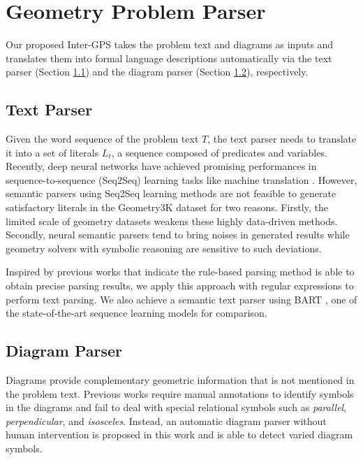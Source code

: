 \documentclass[11pt,a4paper]{article}
\newcommand{\xd}[1]{{\color{blue}{[#1]}}}
\begin{document}
\section{Geometry Problem Parser}
Our proposed Inter-GPS takes the problem text and diagrams as inputs and translates them into formal language descriptions automatically via the text parser (Section \ref{sec:text_parser}) and the diagram parser (Section \ref{sec:diagram_parser}), respectively.

\subsection{Text Parser} \label{sec:text_parser}
Given the word sequence of the problem text $T$, the text parser needs to translate it into a set of literals $L_t$, a sequence composed of predicates and variables. Recently, deep neural networks have achieved promising performances in sequence-to-sequence (Seq2Seq) learning tasks like machine translation \cite{sutskever2014sequence,vaswani2017attention,devlin2018bert}. However, semantic parsers using Seq2Seq learning methods are not feasible to generate satisfactory literals in the Geometry3K dataset for two reasons. Firstly, the limited scale of geometry datasets weakens these highly data-driven methods. Secondly, neural semantic parsers tend to bring noises in generated results while geometry solvers with symbolic reasoning are sensitive to such deviations. 

Inspired by previous works \citep{koo2008simple,seo2015solving,bansal2014tailoring}   that indicate the rule-based parsing method is able to obtain precise parsing results, we apply this approach with regular expressions to perform text parsing.  We also achieve a semantic text parser using BART \cite{lewis2020bart}, one of the state-of-the-art sequence learning models for comparison. 



\subsection{Diagram Parser} \label{sec:diagram_parser}
Diagrams provide complementary geometric information that is not mentioned in the problem text. Previous works \citep{seo2014diagram,seo2015solving} require manual annotations to identify symbols in the diagrams and fail to deal with special relational symbols such as \textit{parallel}, \textit{perpendicular}, and \textit{isosceles}. Instead, an automatic diagram parser without human intervention is proposed in this work and is able to detect varied diagram symbols.
\end{document}

